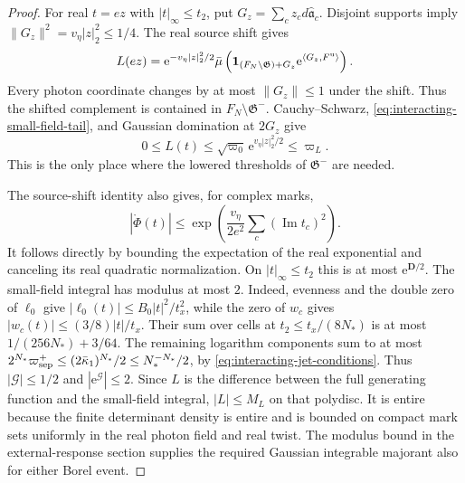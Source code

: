\begin{proof}
For real $t=ez$ with $|t|_\infty\le t_2$,
put $G_z=\sum_cz_cd\widehat{\mathfrak a}_c$.
Disjoint supports imply
$\|G_z\|^2=v_\eta|z|_2^2\le1/4$.
The real source shift gives
\[
 L(ez)=\mathrm e^{-v_\eta|z|_2^2/2}
 \bar\mu\left(\mathbf1_{(F_N\setminus\mathfrak G)+G_z}
                              \mathrm e^{\langle G_z,F^{\rm u}\rangle}\right).
\]
Every photon coordinate changes by at most
$\|G_z\|\le1$ under the shift. Thus the
shifted complement is contained in
$F_N\setminus\mathfrak G^-$.
Cauchy--Schwarz, \eqref{eq:interacting-small-field-tail},
and Gaussian domination at $2G_z$ give
\begin{equation}\label{eq:interacting-real-complement}
 0\le L(t)\le\sqrt{\varpi_0}\,
          \mathrm e^{v_\eta|z|_2^2/2}\le\varpi_L .
\end{equation}
This is the only place where the lowered
thresholds of $\mathfrak G^-$ are needed.

The source-shift identity also gives, for complex marks,
\[
 |\mathring\Phi(t)|\le
       \exp\left(\frac{v_\eta}{2e^2}
                                      \sum_c(\operatorname{Im}t_c)^2\right).
\]
It follows directly by bounding the expectation
of the real exponential and canceling its
real quadratic normalization.
On $|t|_\infty\le t_2$ this is at most
$\mathrm e^{\mathbf D/2}$.
The small-field integral has modulus at most
$2$. Indeed, evenness and the double zero of
$\ell_0$ give $|\ell_0(t)|\le B_0|t|^2/t_x^2$,
while the zero of $w_c$ gives
$|w_c(t)|\le(3/8)|t|/t_x$.
Their sum over cells at
$t_2\le t_x/(8N_*)$ is at most
$1/(256N_*)+3/64$. The remaining logarithm
components sum to at most
$2^{N_*}\varpi_{\rm sep}^+
\le(2\bar\kappa_1)^{N_*}/2\le N_*^{-N_*}/2$,
by \eqref{eq:interacting-jet-conditions}.
Thus $|\mathcal G|\le1/2$ and
$|\mathrm e^{\mathcal G}|\le2$.
Since $L$ is the difference between the
full generating function and the small-field
integral, $|L|\le M_L$ on that polydisc.
It is entire because the finite determinant
density is entire and is bounded on compact
mark sets uniformly in the real photon
field and real twist. The modulus bound
in the external-response section supplies
the required Gaussian integrable majorant
also for either Borel event.


\end{proof}
